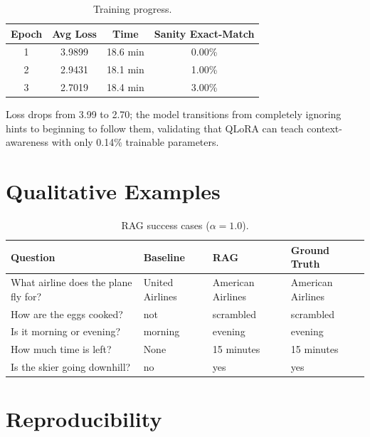 \documentclass[12pt, a4paper]{article}
\begin{document}
\begin{table}[H]
\centering
\caption{Training progress.}
\renewcommand{\arraystretch}{1.3}
\begin{tabular}{@{} c c c c @{}}
\toprule
\textbf{Epoch} & \textbf{Avg Loss} & \textbf{Time} & \textbf{Sanity Exact-Match} \\
\midrule
1 & 3.9899 & 18.6 min & 0.00\% \\
2 & 2.9431 & 18.1 min & 1.00\% \\
3 & 2.7019 & 18.4 min & 3.00\% \\
\bottomrule
\end{tabular}
\end{table}

Loss drops from 3.99 to 2.70; the model transitions from completely ignoring hints to beginning to follow them, validating that QLoRA can teach context-awareness with only 0.14\% trainable parameters.

\section{Qualitative Examples}

\begin{table}[H]
\centering
\caption{RAG success cases ($\alpha{=}1.0$).}
\renewcommand{\arraystretch}{1.3}
\begin{tabular}{@{} p{4cm} l l l @{}}
\toprule
\textbf{Question} & \textbf{Baseline} & \textbf{RAG} & \textbf{Ground Truth} \\
\midrule
What airline does the plane fly for? & United Airlines & American Airlines & American Airlines \\
How are the eggs cooked? & not & scrambled & scrambled \\
Is it morning or evening? & morning & evening & evening \\
How much time is left? & None & 15 minutes & 15 minutes \\
Is the skier going downhill? & no & yes & yes \\
\bottomrule
\end{tabular}
\end{table}

\section{Reproducibility}
\end{document}
